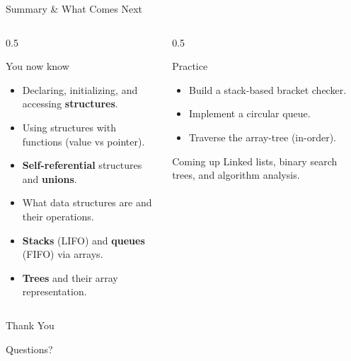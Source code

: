 \documentclass[aspectratio=169]{beamer}
\begin{document}
	\begin{frame}{Summary \& What Comes Next}
		\begin{columns}[T]
			\begin{column}{0.5\textwidth}
				\begin{block}{You now know}
					\begin{itemize}\small
						\item Declaring, initializing, and accessing \textbf{structures}.
						\item Using structures with functions (value vs pointer).
						\item \textbf{Self-referential} structures and \textbf{unions}.
						\item What data structures are and their operations.
						\item \textbf{Stacks} (LIFO) and \textbf{queues} (FIFO) via arrays.
						\item \textbf{Trees} and their array representation.
					\end{itemize}
				\end{block}
			\end{column}
			\begin{column}{0.5\textwidth}
				\begin{block}{Practice}
					\begin{itemize}\small
						\item Build a stack-based bracket checker.
						\item Implement a circular queue.
						\item Traverse the array-tree (in-order).
					\end{itemize}
				\end{block}
				\begin{block}{Coming up}
					\small Linked lists, binary search trees, and algorithm analysis.
				\end{block}
			\end{column}
		\end{columns}
	\end{frame}

	\begin{frame}
		\centering
		\Huge Thank You
		\vspace{0.5cm}

		\normalsize Questions?
	\end{frame}

\end{document}
